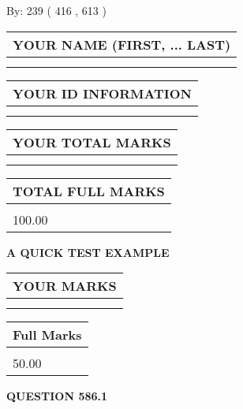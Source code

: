 \documentclass[12pt]{article}
\begin{document}
   
\hspace{1.0in} By: 
 239 ( 416 ,  613 )
   
   
   
   
\newpage 
\setcounter{page}{ 
   586001 } 
   
   
   
   
\noindent\begin{tabular}{|l|}
\hline
YOUR NAME (FIRST, ... LAST)  \\
\hline
 \\ 
 \\ 
\hline
\end{tabular}
\hspace{0.05in} \begin{tabular}{|l|}
\hline
 YOUR   ID   INFORMATION  \\
\hline
 \\ 
 \\ 
\hline
\end{tabular}
   
   
\vspace{0.2in}\noindent\begin{tabular}{|l|}
\hline
YOUR TOTAL MARKS  \\
\hline
 \\ 
 \\ 
\hline
\end{tabular}
\hspace{0.05in} \begin{tabular}{|l|}
\hline
TOTAL FULL MARKS  \\
\hline
 \\ 
100.00 \\
\hline
\end{tabular}
   
   
 \vspace{0.2in}
{\LARGE {\textbf{ A QUICK TEST EXAMPLE}}}
   
   
  
\vspace{0.2in}
  
\noindent\begin{tabular}{|l|}
\hline
 YOUR MARKS  \\
\hline
 \\ 
 \\ 
\hline
\end{tabular}
\hspace{0.05in} \begin{tabular}{|l|}
\hline
 Full Marks  \\
\hline
 \\ 
50.00 \\
\hline
\end{tabular}
{\textbf{\Large{QUESTION
586.1 
}}}
  
\end{document}
